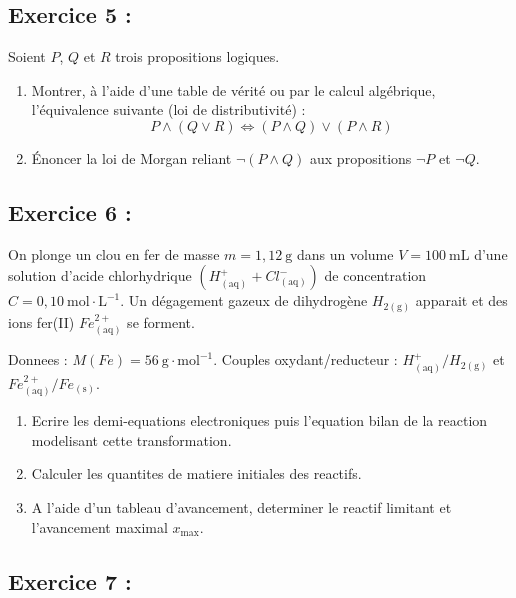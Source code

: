 \documentclass[12pt,a4paper]{article}
\begin{document}
\bigskip

\subsection*{Exercice 5 :}

Soient $P$, $Q$ et $R$ trois propositions logiques.
\begin{enumerate}
    \item Montrer, à l'aide d'une table de vérité ou par le calcul algébrique, l'équivalence suivante (loi de distributivité) :
    \[
    P \land (Q \lor R) \iff (P \land Q) \lor (P \land R)
    \]
    \item Énoncer la loi de Morgan reliant $\neg (P \land Q)$ aux propositions $\neg P$ et $\neg Q$.
\end{enumerate}

\bigskip

\subsection*{Exercice 6 :}

On plonge un clou en fer de masse $m = 1{,}12\mathrm{\ g}$ dans un volume $V = 100\mathrm{\ mL}$ d'une solution d'acide chlorhydrique $(H^+_{(\mathrm{aq})} + Cl^-_{(\mathrm{aq})})$ de concentration $C = 0{,}10\mathrm{\ mol}\cdot\mathrm{L}^{-1}$. 
Un dégagement gazeux de dihydrogène $H_{2(\mathrm{g})}$ apparait et des ions fer(II) $Fe^{2+}_{(\mathrm{aq})}$ se forment.

Donnees : $M(Fe) = 56\mathrm{\ g}\cdot\mathrm{mol}^{-1}$. Couples oxydant/reducteur : $H^+_{(\mathrm{aq})}/H_{2(\mathrm{g})}$ et $Fe^{2+}_{(\mathrm{aq})}/Fe_{(\mathrm{s})}$.

\begin{enumerate}
    \item Ecrire les demi-equations electroniques puis l'equation bilan de la reaction modelisant cette transformation.
    \item Calculer les quantites de matiere initiales des reactifs.
    \item A l'aide d'un tableau d'avancement, determiner le reactif limitant et l'avancement maximal $x_{\mathrm{max}}$.
\end{enumerate}

\bigskip


\subsection*{Exercice 7 :}
\end{document}

